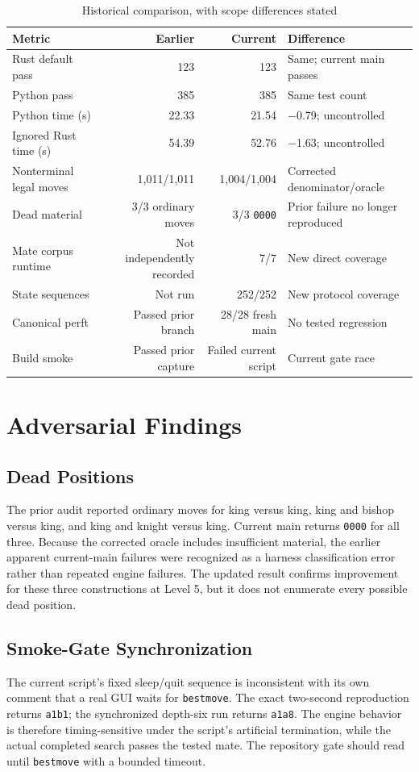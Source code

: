 \documentclass[conference]{IEEEtran}
\begin{document}
\begin{table}[t]
\caption{Historical comparison, with scope differences stated}
\label{tab:comparison}
\centering
\begin{tabularx}{\textwidth}{@{}l r r X@{}}
\toprule
Metric & Earlier & Current & Difference \\
\midrule
Rust default pass & 123 & 123 & Same; current main passes \\
Python pass & 385 & 385 & Same test count \\
Python time (s) & 22.33 & 21.54 & $-$0.79; uncontrolled \\
Ignored Rust time (s) & 54.39 & 52.76 & $-$1.63; uncontrolled \\
Nonterminal legal moves & 1,011/1,011 & 1,004/1,004 & Corrected denominator/oracle \\
Dead material & 3/3 ordinary moves & 3/3 \texttt{0000} & Prior failure no longer reproduced \\
Mate corpus runtime & Not independently recorded & 7/7 & New direct coverage \\
State sequences & Not run & 252/252 & New protocol coverage \\
Canonical perft & Passed prior branch & 28/28 fresh main & No tested regression \\
Build smoke & Passed prior capture & Failed current script & Current gate race \\
\bottomrule
\end{tabularx}
\end{table}

\section{Adversarial Findings}
\subsection{Dead Positions}
The prior audit reported ordinary moves for king versus king, king and bishop versus king, and king and knight versus king. Current main returns \texttt{0000} for all three. Because the corrected oracle includes insufficient material, the earlier apparent current-main failures were recognized as a harness classification error rather than repeated engine failures. The updated result confirms improvement for these three constructions at Level 5, but it does not enumerate every possible dead position.

\subsection{Smoke-Gate Synchronization}
The current script's fixed sleep/quit sequence is inconsistent with its own comment that a real GUI waits for \texttt{bestmove}. The exact two-second reproduction returns \texttt{a1b1}; the synchronized depth-six run returns \texttt{a1a8}. The engine behavior is therefore timing-sensitive under the script's artificial termination, while the actual completed search passes the tested mate. The repository gate should read until \texttt{bestmove} with a bounded timeout.
\end{document}
